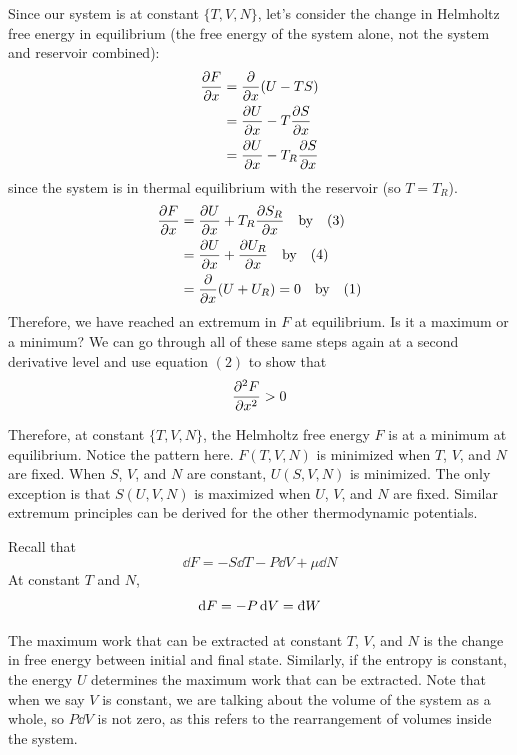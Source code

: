 \documentclass[a4paper,twoside,master.tex]{subfiles}
\begin{document}
Since our system is at constant $ \{T,V,N\} $, let's consider the change in Helmholtz free energy in equilibrium (the free energy of the system alone, not the system and reservoir combined):
\begin{align}
    \pdv{F}{x} &= \pdv{x} (U - TS) \\
    &= \pdv{U}{x} - T \pdv{S}{x} \\
    &= \pdv{U}{x} - T_R \pdv{S}{x}
\end{align}
since the system is in thermal equilibrium with the reservoir (so $ T = T_R $).
\begin{align}
    \pdv{F}{x} &= \pdv{U}{x} + T_R \pdv{S_R}{x} \qq{by} (3) \\
    &= \pdv{U}{x} + \pdv{U_R}{x} \qq{by} (4) \\
    &= \pdv{x}(U + U_R) = 0 \qq{by} (1)
\end{align}
Therefore, we have reached an extremum in $ F $ at equilibrium. Is it a maximum or a minimum? We can go through all of these same steps again at a second derivative level and use equation $ (2) $ to show that
\begin{equation}
    \pdv[2]{F}{x} > 0
\end{equation}

Therefore, at constant $ \{T,V,N\} $, the Helmholtz free energy $ F $ is at a minimum at equilibrium. Notice the pattern here. $ F(T,V,N) $ is minimized when $ T $, $ V $, and $ N $ are fixed. When $ S $, $ V $, and $ N $ are constant, $ U(S,V,N) $ is minimized. The only exception is that $ S(U,V,N) $ is maximized when $ U $, $ V $, and $ N $ are fixed. Similar extremum principles can be derived for the other thermodynamic potentials.


Recall that
\begin{equation}
    \dd{F} = -S \dd{T} - P \dd{V} + \mu \dd{N}
\end{equation}
At constant $ T $ and $ N $,
\begin{equation}
    \dd{F} = - P \dd{V} = \dbar{W}
\end{equation}

The maximum work that can be extracted at constant $ T $, $ V $, and $ N $ is the change in free energy between initial and final state. Similarly, if the entropy is constant, the energy $ U $ determines the maximum work that can be extracted. Note that when we say $ V $ is constant, we are talking about the volume of the system as a whole, so $ P \dd{V} $ is not zero, as this refers to the rearrangement of volumes inside the system.
\end{document}
